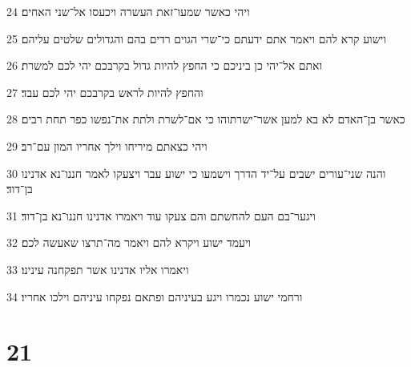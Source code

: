 \par 24 ויהי כאשר שמעו־זאת העשרה ויכעסו אל־שני האחים׃
\par 25 וישוע קרא להם ויאמר אתם ידעתם כי־שרי הגוים רדים בהם והגדולים שלטים עליהם׃
\par 26 ואתם אל־יהי כן ביניכם כי החפץ להיות גדול בקרבכם יהי לכם למשרת׃
\par 27 והחפץ להיות לראש בקרבכם יהי לכם עבד׃
\par 28 כאשר בן־האדם לא בא למען אשר־ישרתוהו כי אם־לשרת ולתת את־נפשו כפר תחת רבים׃
\par 29 ויהי כצאתם מיריחו וילך אחריו המון עם־רב׃
\par 30 והנה שני־עורים ישבים על־יד הדרך וישמעו כי ישוע עבר ויצעקו לאמר חננו־נא אדנינו בן־דוד׃
\par 31 ויגער־בם העם להחשתם והם צעקו עוד ויאמרו אדנינו חננו־נא בן־דוד׃
\par 32 ויעמד ישוע ויקרא להם ויאמר מה־תרצו שאעשה לכם׃
\par 33 ויאמרו אליו אדנינו אשר תפקחנה עינינו׃
\par 34 ורחמי ישוע נכמרו ויגע בעיניהם ופתאם נפקחו עיניהם וילכו אחריו׃

\chapter{21}

